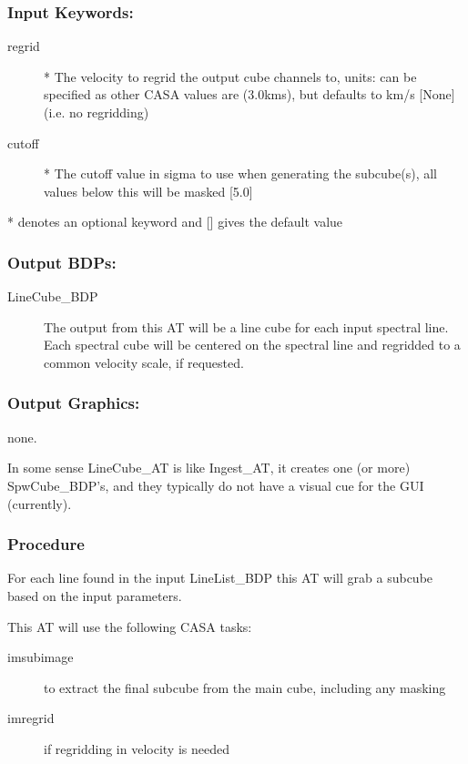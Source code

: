 \subsubsection{Input Keywords:}

\begin{description}
\item[regrid]* The velocity to regrid the output cube channels to, units: can be specified as other CASA values are (3.0kms), but defaults to km/s [None] (i.e. no regridding)
\item[cutoff]* The cutoff value in sigma to use when generating the subcube(s), all values below this will be masked [5.0]
\end{description}
* denotes an optional keyword and [] gives the default value

\subsubsection{Output BDPs:}

\begin{description}
\item[LineCube\_BDP]
The output from this AT will be a line cube for each input spectral line.
Each spectral cube will be centered on the spectral line and regridded to a common velocity scale, if requested. 
\end{description}

\subsubsection{Output Graphics:}

none.

In some sense LineCube\_AT is like Ingest\_AT, it creates one (or more) SpwCube\_BDP's, 
and they typically do not have a visual cue for the GUI (currently).


\subsubsection{Procedure}
For each line found in the input LineList\_BDP this AT will grab a subcube based on the input parameters.

This AT will use the following CASA tasks:
\begin{description}
\item[imsubimage] to extract the final subcube from the main cube, including any masking
\item[imregrid] if regridding in velocity is needed
\end{description}

